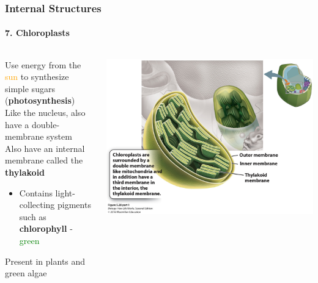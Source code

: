 \documentclass[10pt]{beamer}
\begin{document}
	
\begin{frame}[t]
\frametitle{Internal Structures}
\framesubtitle{7. Chloroplasts}	
\vspace{0.5cm}

		\begin{columns}
		\begin{column}{0.5\textwidth}
			Use energy from the \textcolor{orange}{sun} to synthesize simple sugars (\textbf{photosynthesis})\\
			\vspace{0.25cm}
			Like the nucleus, also have a double-membrane system\\
			\vspace{0.25cm}
			Also have an internal membrane called the \textbf{thylakoid}\\
				\begin{itemize}
					\item Contains light-collecting pigments such as \textbf{chlorophyll} - \textcolor{green}{green}
				\end{itemize}
			\vspace{0.25cm}
			Present in plants and green algae\\
		\end{column}
		
		\begin{column}{0.5\textwidth}
			\centerline{\includegraphics[width=1.0\textwidth]{figures/figure_05_28_01.jpg}}
		\end{column}
	\end{columns}
\end{frame}
\end{document}
